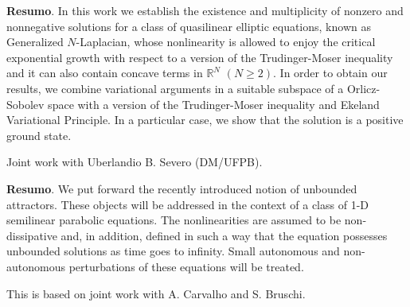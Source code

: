 	
	
	\noindent\textbf{Resumo}.\label{jas} 
	In this work we establish the existence and multiplicity of nonzero and nonnegative solutions for a class of quasilinear elliptic equations, known as Generalized $N$-Laplacian, whose nonlinearity is allowed to enjoy the critical exponential growth with respect to a version of the Trudinger-Moser inequality and it can also contain concave terms in $\mathbb{R}^N$ $(N\geq 2)$. In order to obtain our results, we combine variational arguments in a suitable subspace of a Orlicz-Sobolev space with a version of the Trudinger-Moser inequality and Ekeland Variational Principle. In a particular case, we show that the solution is a positive ground state.

	\vspace*{0.5cm} \noindent Joint work with Uberlandio B. Severo (DM/UFPB).
	
	\vspace{24pt}

	
	
	\noindent\textbf{Resumo}.\label{jp} 
	We put forward the recently introduced notion of unbounded attractors. These objects will be addressed in the context of a class of 1-D semilinear parabolic equations. The nonlinearities are assumed to be non-dissipative and, in addition, defined in such a way that the equation possesses unbounded solutions as time goes to infinity. Small autonomous and non-autonomous perturbations of these equations will be treated. 
	
	\vspace*{0.5cm} \noindent This is based on joint work with A. Carvalho and S. Bruschi.
	
	\vspace{24pt}

